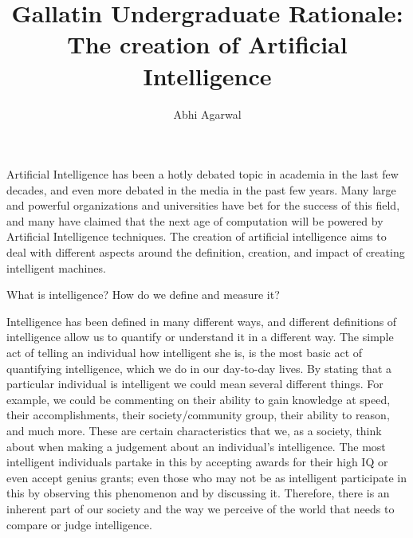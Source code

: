 \documentclass[11pt]{article}
\title{Gallatin Undergraduate Rationale: The creation of Artificial Intelligence}
\author{Abhi Agarwal}
\date{}
\begin{document}
\maketitle


\par Artificial Intelligence has been a hotly debated topic in academia in the last few decades, and even more debated in the media in the past few years. Many large and powerful organizations and universities have bet for the success of this field, and many have claimed that the next age of computation will be powered by Artificial Intelligence techniques. The creation of artificial intelligence aims to deal with different aspects around the definition, creation, and impact of creating intelligent machines.\\
\begin{center}
	{\large What is intelligence? How do we define and measure it?\par}
\end{center}

\par Intelligence has been defined in many different ways, and different definitions of intelligence allow us to quantify or understand it in a different way. The simple act of telling an individual how intelligent she is, is the most basic act of quantifying intelligence, which we do in our day-to-day lives. By stating that a particular individual is intelligent we could mean several different things. For example, we could be commenting on their ability to gain knowledge at speed, their accomplishments, their society/community group, their ability to reason, and much more. These are certain characteristics that we, as a society, think about when making a judgement about an individual's intelligence. The most intelligent individuals partake in this by accepting awards for their high IQ or even accept genius grants; even those who may not be as intelligent participate in this by observing this phenomenon and by discussing it. Therefore, there is an inherent part of our society and the way we perceive of the world that needs to compare or judge intelligence.
\end{document}

